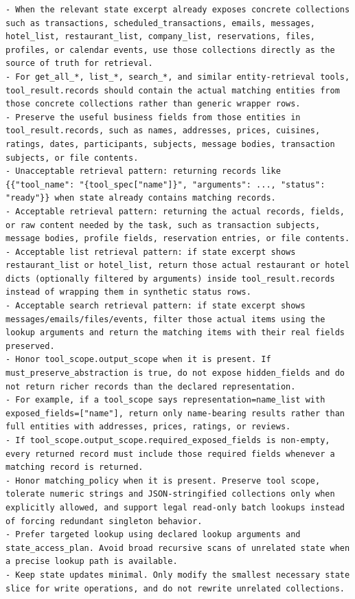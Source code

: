\begin{tcolorbox}[promptbox,title={Tool-Code Generator Prompt}]
\begin{Verbatim}[breaklines=true, breakanywhere=true, fontsize=\scriptsize, breaksymbolleft={}]
- When the relevant state excerpt already exposes concrete collections such as transactions, scheduled_transactions, emails, messages, hotel_list, restaurant_list, company_list, reservations, files, profiles, or calendar events, use those collections directly as the source of truth for retrieval.
- For get_all_*, list_*, search_*, and similar entity-retrieval tools, tool_result.records should contain the actual matching entities from those concrete collections rather than generic wrapper rows.
- Preserve the useful business fields from those entities in tool_result.records, such as names, addresses, prices, cuisines, ratings, dates, participants, subjects, message bodies, transaction subjects, or file contents.
- Unacceptable retrieval pattern: returning records like {{"tool_name": "{tool_spec["name"]}", "arguments": ..., "status": "ready"}} when state already contains matching records.
- Acceptable retrieval pattern: returning the actual records, fields, or raw content needed by the task, such as transaction subjects, message bodies, profile fields, reservation entries, or file contents.
- Acceptable list retrieval pattern: if state excerpt shows restaurant_list or hotel_list, return those actual restaurant or hotel dicts (optionally filtered by arguments) inside tool_result.records instead of wrapping them in synthetic status rows.
- Acceptable search retrieval pattern: if state excerpt shows messages/emails/files/events, filter those actual items using the lookup arguments and return the matching items with their real fields preserved.
- Honor tool_scope.output_scope when it is present. If must_preserve_abstraction is true, do not expose hidden_fields and do not return richer records than the declared representation.
- For example, if a tool_scope says representation=name_list with exposed_fields=["name"], return only name-bearing results rather than full entities with addresses, prices, ratings, or reviews.
- If tool_scope.output_scope.required_exposed_fields is non-empty, every returned record must include those required fields whenever a matching record is returned.
- Honor matching_policy when it is present. Preserve tool scope, tolerate numeric strings and JSON-stringified collections only when explicitly allowed, and support legal read-only batch lookups instead of forcing redundant singleton behavior.
- Prefer targeted lookup using declared lookup arguments and state_access_plan. Avoid broad recursive scans of unrelated state when a precise lookup path is available.
- Keep state updates minimal. Only modify the smallest necessary state slice for write operations, and do not rewrite unrelated collections.

\end{Verbatim}
\end{tcolorbox}
